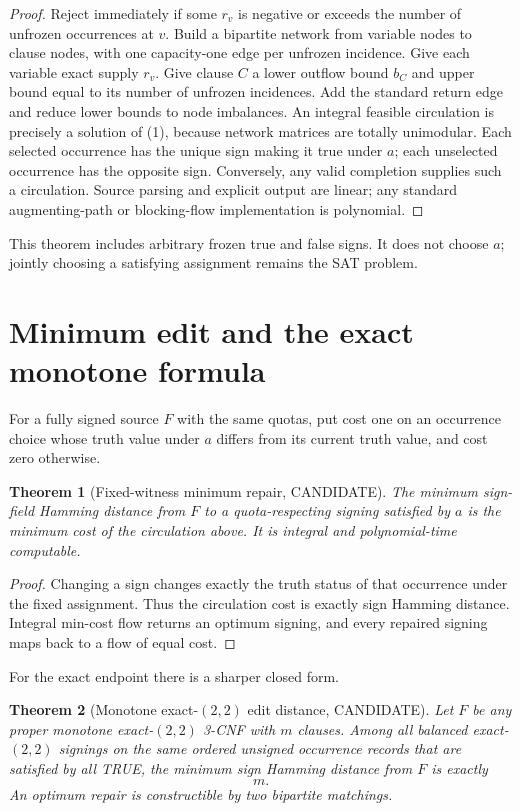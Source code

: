 \documentclass[11pt]{article}
\newtheorem{theorem}{Theorem}
\begin{document}
\begin{proof}
Reject immediately if some $r_v$ is negative or exceeds the number of unfrozen
occurrences at $v$.  Build a bipartite network from variable nodes to clause nodes, with
one capacity-one edge per unfrozen incidence.  Give each variable exact supply $r_v$.
Give clause $C$ a lower outflow bound $b_C$ and upper bound equal to its number of
unfrozen incidences.  Add the standard return edge and reduce lower bounds to node
imbalances.  An integral feasible circulation is precisely a solution of (1), because
network matrices are totally unimodular.  Each selected occurrence has the unique sign
making it true under $a$; each unselected occurrence has the opposite sign.  Conversely,
any valid completion supplies such a circulation.  Source parsing and explicit output
are linear; any standard augmenting-path or blocking-flow implementation is polynomial.
\end{proof}

This theorem includes arbitrary frozen true and false signs.  It does not choose $a$;
jointly choosing a satisfying assignment remains the SAT problem.

\section{Minimum edit and the exact monotone formula}

For a fully signed source $F$ with the same quotas, put cost one on an occurrence choice
whose truth value under $a$ differs from its current truth value, and cost zero otherwise.

\begin{theorem}[Fixed-witness minimum repair, CANDIDATE]
The minimum sign-field Hamming distance from $F$ to a quota-respecting signing satisfied
by $a$ is the minimum cost of the circulation above.  It is integral and polynomial-time
computable.
\end{theorem}

\begin{proof}
Changing a sign changes exactly the truth status of that occurrence under the fixed
assignment.  Thus the circulation cost is exactly sign Hamming distance.  Integral
min-cost flow returns an optimum signing, and every repaired signing maps back to a flow
of equal cost.
\end{proof}

For the exact endpoint there is a sharper closed form.

\begin{theorem}[Monotone exact-$(2,2)$ edit distance, CANDIDATE]
Let $F$ be any proper monotone exact-$(2,2)$ 3-CNF with $m$ clauses.  Among all balanced
exact-$(2,2)$ signings on the same ordered unsigned occurrence records that are satisfied
by all TRUE, the minimum sign Hamming distance from $F$ is exactly
\[
\boxed{m}.
\]
An optimum repair is constructible by two bipartite matchings.
\end{theorem}
\end{document}
